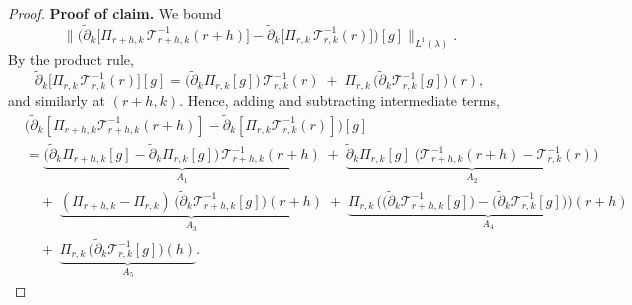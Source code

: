 \documentclass[11pt]{article}
\newcommand{\adk}{\widetilde{\partial}_k}
\theoremstyle{plain}
\begin{document}
\begin{proof}
\noindent \textbf{Proof of claim.}
We bound
\[
\big\|\big(\adk\!\big[\Pi_{r+h,k}\,\mathcal{T}_{r+h,k}^{-1}(r+h)\big]
      - \adk\!\big[\Pi_{r,k}\,\mathcal{T}_{r,k}^{-1}(r)\big]\big)[g]\big\|_{L^1(\lambda)}.
\]
By the product rule,
\[
\adk\!\big[\Pi_{r,k}\,\mathcal{T}_{r,k}^{-1}(r)\big][g]
= \big(\adk \Pi_{r,k}[g]\big)\,\mathcal{T}_{r,k}^{-1}(r)
\;+\;\Pi_{r,k}\,\big(\adk \mathcal{T}_{r,k}^{-1}[g]\big)(r),
\]
and similarly at $(r{+}h,k)$. Hence, adding and subtracting intermediate terms,
\begin{align*}
&\big(\adk\![\Pi_{r+h,k}\mathcal{T}_{r+h,k}^{-1}(r{+}h)]
      - \adk\![\Pi_{r,k}\mathcal{T}_{r,k}^{-1}(r)]\big)[g] \\
&= \underbrace{\big(\adk \Pi_{r+h,k}[g]-\adk \Pi_{r,k}[g]\big)\,\mathcal{T}_{r+h,k}^{-1}(r{+}h)}_{A_1}
 \;+\; \underbrace{\adk \Pi_{r,k}[g]\;\big(\mathcal{T}_{r+h,k}^{-1}(r{+}h)-\mathcal{T}_{r,k}^{-1}(r)\big)}_{A_2} \\
&\quad+\;\underbrace{(\Pi_{r+h,k}-\Pi_{r,k})\,\big(\adk \mathcal{T}_{r+h,k}^{-1}[g]\big)(r{+}h)}_{A_3}
 \;+\; \underbrace{\Pi_{r,k}\,\Big(\big(\adk \mathcal{T}_{r+h,k}^{-1}[g]\big)-\big(\adk \mathcal{T}_{r,k}^{-1}[g]\big)\Big)(r{+}h)}_{A_4} \\
&\quad+\;\underbrace{\Pi_{r,k}\,\big(\adk \mathcal{T}_{r,k}^{-1}[g]\big)(h)}_{A_5}.
\end{align*}


\end{proof}
\end{document}

